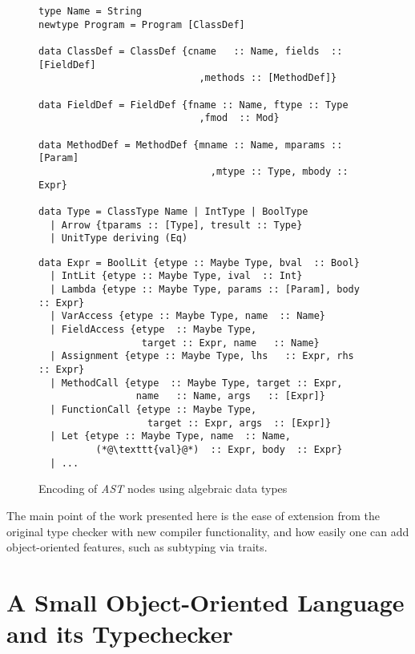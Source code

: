 \documentclass[sigplan,screen]{acmart}
\newcommand{\astt}[0]{\textit{AST}}
\begin{document}
\begin{figure*}[ht]
\begin{minipage}[t]{.46\linewidth}
\begin{lstlisting}[style=encore, numbers=none]
type Name = String
newtype Program = Program [ClassDef]

data ClassDef = ClassDef {cname   :: Name, fields  :: [FieldDef]
                            ,methods :: [MethodDef]}

data FieldDef = FieldDef {fname :: Name, ftype :: Type
                            ,fmod  :: Mod}

data MethodDef = MethodDef {mname :: Name, mparams :: [Param]
                              ,mtype :: Type, mbody :: Expr}

data Type = ClassType Name | IntType | BoolType
  | Arrow {tparams :: [Type], tresult :: Type}
  | UnitType deriving (Eq)
  \end{lstlisting}
\end{minipage}
%
\begin{minipage}[t]{.46\linewidth}
\begin{lstlisting}[style=encore, numbers=none]
data Expr = BoolLit {etype :: Maybe Type, bval  :: Bool}
  | IntLit {etype :: Maybe Type, ival  :: Int}
  | Lambda {etype :: Maybe Type, params :: [Param], body  :: Expr}
  | VarAccess {etype :: Maybe Type, name  :: Name}
  | FieldAccess {etype  :: Maybe Type,
                  target :: Expr, name   :: Name}
  | Assignment {etype :: Maybe Type, lhs   :: Expr, rhs   :: Expr}
  | MethodCall {etype  :: Maybe Type, target :: Expr,
                 name   :: Name, args   :: [Expr]}
  | FunctionCall {etype :: Maybe Type,
                   target :: Expr, args  :: [Expr]}
  | Let {etype :: Maybe Type, name  :: Name,
          (*@\texttt{val}@*)  :: Expr, body  :: Expr}
  | ...
\end{lstlisting}
\end{minipage}
\caption{\label{fig:ast}Encoding of \astt{} nodes using algebraic data types}
\end{figure*}

The main point of the work presented here
is the ease of extension from the original type
checker with new compiler functionality, and how
easily one can add object-oriented features, such as
subtyping via traits.


\section{A Small Object-Oriented Language and its Typechecker}
\label{sec:oop}
\end{document}
